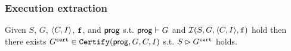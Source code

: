 \documentclass[12pt]{article}
\begin{document}


          





  
    

\subsubsection{Execution extraction}

\begin{lemma}
  \label{lemma:sim-extract}
  Given $S$, $G$, $\langle C, I \rangle$, ${\mathtt{f}}$, and $\mathsf{prog}$ 
  s.t. $\mathsf{prog} \vdash G$ and $\mathcal{I}(S, G, \langle C, I \rangle, {\mathtt{f}})$ hold
  then there exists $G^{{\mathtt{cert}}} \in {\mathtt{Certify}}(\mathsf{prog}, G, C, I)$ s.t.
  $S \rhd G^{{\mathtt{cert}}}$ holds.
\end{lemma}

  
  
\setmonofont[Mapping=tex-text]{CMU Typewriter Text}


\end{document}

